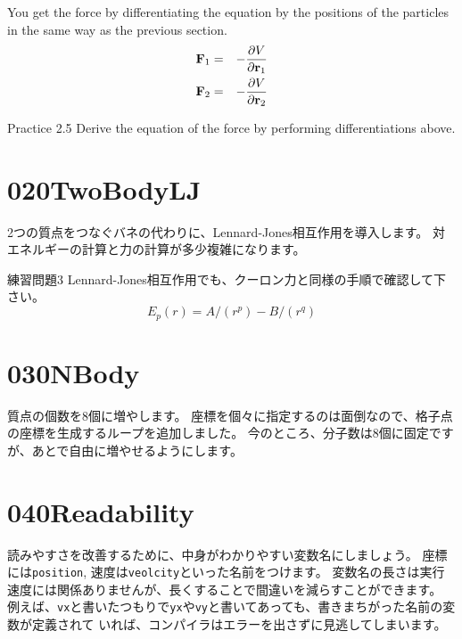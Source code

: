 \documentclass[a4,10pt]{article}
\begin{document}
You get the force by differentiating the equation by the positions of
the particles in the same way as the previous section.
\begin{eqnarray}
{\bf F}_1&=& -\frac{\partial V}{\partial{\bf r}_1}\\
{\bf F}_2&=& -\frac{\partial V}{\partial{\bf r}_2}\\
\end{eqnarray}

\begin{itembox}[l]{Practice 2.5}
Derive the equation of the force by performing differentiations above.
\end{itembox}



\section{020TwoBodyLJ}

2つの質点をつなぐバネの代わりに、Lennard-Jones相互作用を導入します。
対エネルギーの計算と力の計算が多少複雑になります。

\begin{itembox}[l]{練習問題3}
Lennard-Jones相互作用でも、クーロン力と同様の手順で確認して下さい。
\begin{equation}
    E_p(r) = A/(r^p) - B/(r^q)
\end{equation}
\end{itembox}


\section{030NBody}

質点の個数を8個に増やします。
座標を個々に指定するのは面倒なので、格子点の座標を生成するループを追加しました。
今のところ、分子数は8個に固定ですが、あとで自由に増やせるようにします。


\section{040Readability}

読みやすさを改善するために、中身がわかりやすい変数名にしましょう。
座標には{\tt position}, 速度は{\tt veolcity}といった名前をつけます。
変数名の長さは実行速度には関係ありませんが、長くすることで間違いを減らすことができます。
例えば、{\tt vx}と書いたつもりで{\tt yx}や{\tt vy}と書いてあっても、書きまちがった名前の変数が定義されて
いれば、コンパイラはエラーを出さずに見逃してしまいます。
\end{document}
